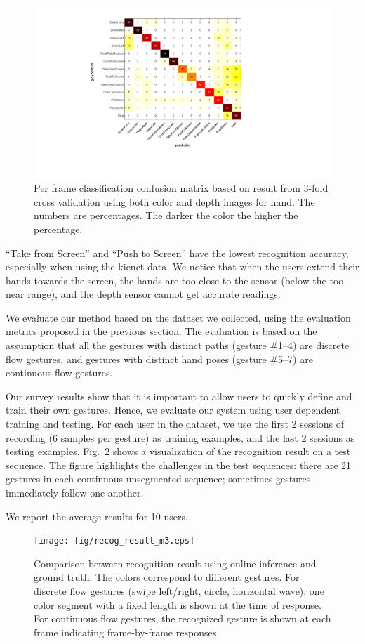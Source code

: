 \begin{figure}[tb]
\centering
\includegraphics[trim={6cm 3.5cm 10cm 1.5cm}, clip,
width=0.6\columnwidth]{figures/confusion_color_depth.png} \caption{Per frame
classification confusion matrix based on result from 3-fold cross validation using 
both color and depth images for hand. The numbers are percentages. The darker
the color the higher the percentage.}
\label{fig:confusion}
\end{figure}

``Take from Screen'' and ``Push to Screen'' have the lowest recognition
accuracy, especially when using the kienct data. We notice that when the users
extend their hands towards the screen, the hands are too close to the sensor
(below the too near range), and the depth sensor cannot get accurate readings.

We evaluate our method based on the dataset we collected, using the
evaluation metrics proposed in the previous section. The evaluation is based
on the assumption that all the gestures with distinct paths (gesture \#1--4)
are discrete flow gestures, and gestures with distinct hand poses (gesture
\#5--7) are continuous flow gestures. 

Our survey results show that it is
important to allow users to quickly define and train their own gestures. Hence,
we evaluate our system using user dependent training and testing. For each user
in the dataset, we use the first 2 sessions of recording (6 samples per gesture)
as training examples, and the last 2 sessions as testing examples.
Fig.~\ref{fig:recog-result} shows a visualization of the recognition result on a
test sequence. The figure highlights the challenges in the test sequences:
there are 21 gestures in each continuous unsegmented sequence; sometimes
gestures immediately follow one another.

We report the average results for 10 users.

\begin{figure}[t]
\centering
\texttt{[image: fig/recog\_result\_m3.eps]}
\caption{Comparison between recognition result using online inference
and ground truth.
The colors correspond to different gestures. For discrete flow gestures
(swipe left/right, circle, horizontal wave), one color segment with a fixed
length is shown at the time of response. For continuous flow gestures, the
recognized gesture is shown at each frame indicating frame-by-frame responses.}
\label{fig:recog-result}
\end{figure}

